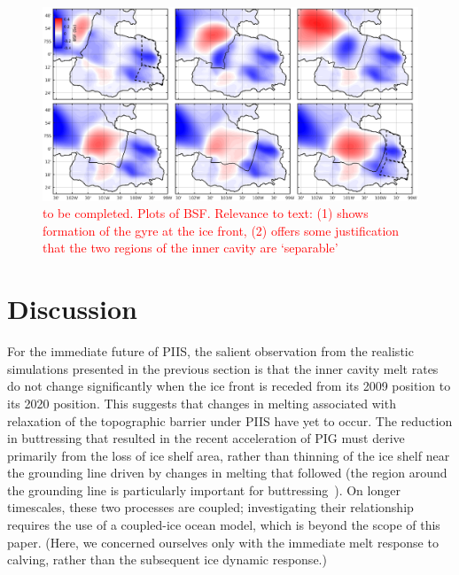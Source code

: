 \documentclass[draft]{agujournal2019}
\newcommand{\red}[1]{\textcolor{red}{#1}}
\begin{document}
\begin{figure}
    \centering
    \includegraphics[width = \textwidth]{../make_figures/plots/figure13.eps}
    \caption{\red{to be completed. Plots of BSF. Relevance to text: (1) shows formation of the gyre at the ice front, (2) offers some justification that the two regions of the inner cavity are `separable'}} 
    \label{fig:figure11}
\end{figure}
\section{Discussion}\label{S:Discussion}

For the immediate future of PIIS, the salient observation from the realistic simulations presented in the previous section is that the inner cavity melt rates do not change significantly when the ice front is receded from its 2009 position to its 2020 position. This suggests that changes in melting associated with relaxation of the topographic barrier under PIIS have yet to occur. The reduction in buttressing that resulted in the recent acceleration of PIG \cite{Joughin2021ScienceAdv} must derive primarily from  the loss of ice shelf area, rather than thinning of the ice shelf near the grounding line driven by changes in melting that followed (the region around the grounding line is particularly important for buttressing~\cite{Reese2018NatureClimCh}). On longer timescales, these two processes are coupled; investigating their relationship requires the use of a coupled-ice ocean model, which is beyond the scope of this paper. (Here, we concerned ourselves only with the immediate melt response to calving, rather than the subsequent ice dynamic response.)
\end{document}
